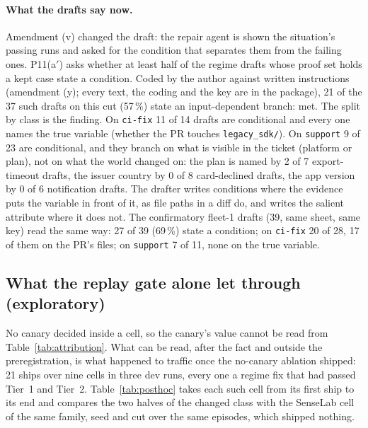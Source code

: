 \documentclass[11pt]{article}
\newcommand{\code}[1]{\texttt{#1}}
\begin{document}
\paragraph{What the drafts say now.} Amendment (v) changed the draft: the repair agent is shown
the situation's passing runs and asked for the condition that separates them from the failing
ones. P11(a$'$) asks whether at least half of the regime drafts whose proof set holds a kept case
state a condition. Coded by the author against written instructions (amendment (y); every text,
the coding and the key are in the package), 21 of the 37 such drafts on this cut (57\,\%) state
an input-dependent branch: met. The split by class is the finding. On \code{ci-fix} 11 of 14
drafts are conditional and every one names the true variable (whether the PR touches
\code{legacy\_sdk/}). On \code{support} 9 of 23 are conditional, and they branch on what is
visible in the ticket (platform or plan), not on what the world changed on: the plan is named by
2 of 7 export-timeout drafts, the issuer country by 0 of 8 card-declined drafts, the app version
by 0 of 6 notification drafts. The drafter writes conditions where the evidence puts the variable
in front of it, as file paths in a diff do, and writes the salient attribute where it does not.
The confirmatory fleet-1 drafts (39, same sheet, same key) read the same way: 27 of 39 (69\,\%)
state a condition; on \code{ci-fix} 20 of 28, 17 of them on the PR's files; on \code{support} 7
of 11, none on the true variable.

\subsection{What the replay gate alone let through (exploratory)}
\label{sec:posthoc}

No canary decided inside a cell, so the canary's value cannot be read from
Table~\ref{tab:attribution}. What can be read, after the fact and outside the preregistration,
is what happened to traffic once the no-canary ablation shipped: 21 ships over nine cells in
three dev runs, every one a regime fix that had passed Tier~1 and Tier~2.
Table~\ref{tab:posthoc} takes each such cell from its first ship to its end and compares the two
halves of the changed class with the SenseLab cell of the same family, seed and cut over the
same episodes, which shipped nothing.
\end{document}
